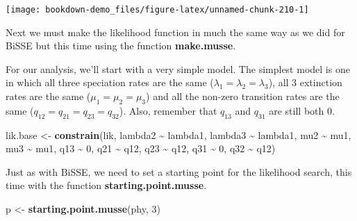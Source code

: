 \documentclass[
]{book}
\newenvironment{Shaded}{\begin{snugshade}}{\end{snugshade}}
\newcommand{\DecValTok}[1]{\textcolor[rgb]{0.00,0.00,0.81}{#1}}
\newcommand{\KeywordTok}[1]{\textcolor[rgb]{0.13,0.29,0.53}{\textbf{#1}}}
\newcommand{\NormalTok}[1]{#1}
\newcommand{\OperatorTok}[1]{\textcolor[rgb]{0.81,0.36,0.00}{\textbf{#1}}}
\newcommand{\StringTok}[1]{\textcolor[rgb]{0.31,0.60,0.02}{#1}}
\begin{document}
\begin{center}\texttt{[image: bookdown-demo\_files/figure-latex/unnamed-chunk-210-1]} \end{center}

Next we must make the likelihood function in much the same way as we did for BiSSE but this time using the function \textbf{make.musse}.

\begin{Shaded}
\end{Shaded}

For our analysis, we'll start with a very simple model. The simplest model is one in which all three speciation rates are the same (\(\lambda_{1} = \lambda_{2} = \lambda_{3}\)), all 3 extinction rates are the same (\(\mu_{1} = \mu_{2} = \mu_{3}\)) and all the non-zero transition rates are the same (\(q_{12} = q_{21} = q_{23} = q_{32}\)). Also, remember that \(q_{13}\) and \(q_{31}\) are still both 0.

\begin{Shaded}
\begin{Highlighting}[]
\NormalTok{lik.base \textless{}{-}}\StringTok{ }\KeywordTok{constrain}\NormalTok{(lik, lambda2 }\OperatorTok{\textasciitilde{}}\StringTok{ }\NormalTok{lambda1, lambda3 }\OperatorTok{\textasciitilde{}}\StringTok{ }\NormalTok{lambda1,}
\NormalTok{                      mu2 }\OperatorTok{\textasciitilde{}}\StringTok{ }\NormalTok{mu1, mu3 }\OperatorTok{\textasciitilde{}}\StringTok{ }\NormalTok{mu1,}
\NormalTok{                      q13 }\OperatorTok{\textasciitilde{}}\StringTok{ }\DecValTok{0}\NormalTok{, q21 }\OperatorTok{\textasciitilde{}}\StringTok{ }\NormalTok{q12, }
\NormalTok{                      q23 }\OperatorTok{\textasciitilde{}}\StringTok{ }\NormalTok{q12, q31 }\OperatorTok{\textasciitilde{}}\StringTok{ }\DecValTok{0}\NormalTok{, q32 }\OperatorTok{\textasciitilde{}}\StringTok{ }\NormalTok{q12)}
\end{Highlighting}
\end{Shaded}

Just as with BiSSE, we need to set a starting point for the likelihood search, this time with the function \textbf{starting.point.musse}.

\begin{Shaded}
\begin{Highlighting}[]
\NormalTok{p \textless{}{-}}\StringTok{ }\KeywordTok{starting.point.musse}\NormalTok{(phy, }\DecValTok{3}\NormalTok{)}
\end{Highlighting}
\end{Shaded}
\end{document}
